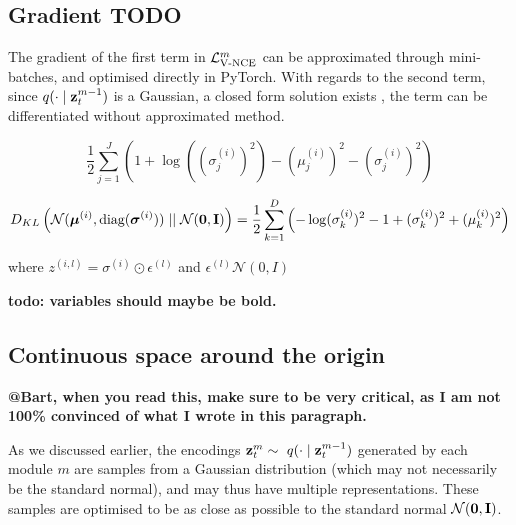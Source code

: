 	\subsection{Gradient \textbf{TODO}}
		The gradient of the first term in $\mathcal{L}_{\text{V-NCE}}^m$ can be approximated through mini-batches, and optimised directly in PyTorch. With regards to the second term, since $q(\cdot \mid \mathbf{z}_t^{m-1})$ is a Gaussian, a closed form solution exists \cite{kingmaAutoEncodingVariationalBayes2022}, the term can be differentiated without approximated method.
		
		
		\begin{equation}
			\frac{1}{2}\sum_{j=1}^J \left( 1 + \log((\sigma_j^{(i)})^2) - (\mu_j^{(i)})^2 - (\sigma_j^{(i)})^2 \right) 
		\end{equation}
		
		\begin{equation} %
			\kl{\normal}{\standardnormal} = \latentspaceconstraintclosedform
		\end{equation}
		
		
		where $z^(i,l) = \sigma ^{(i)} \odot \epsilon^{(l)}$ and $\epsilon^(l) \mathcal{N}(0, I)$
		
		\textbf{todo: variables should maybe be bold.}
		
		
	
	
	\subsection{Continuous space around the origin} \label{cha:contin_space}
		\textbf{@Bart, when you read this, make sure to be very critical, as I am not 100\% convinced of what I wrote in this paragraph.}
		
		
			As we discussed earlier, the encodings $\mathbf{z}_t^m \sim ~ q(\cdot \mid \mathbf{z}_t^{m-1})$ generated by each module $m$ are samples from a Gaussian distribution (which may not necessarily be the standard normal), and may thus have multiple representations. These samples are optimised to be as close as possible to the standard normal $\mathcal{N}(\bm{\mathbf{0}}, \mathbf{I})$. 
	
